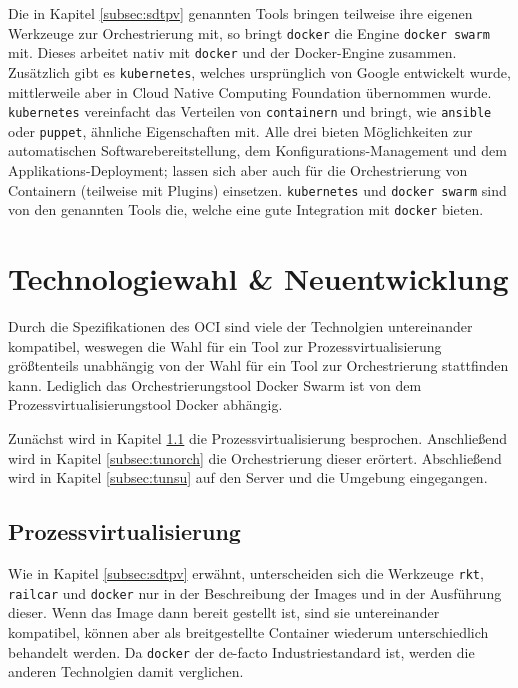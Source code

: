 \documentclass[11pt,a4paper]{article}
\begin{document}
Die in Kapitel \ref{subsec:sdtpv} genannten Tools bringen teilweise ihre 
eigenen Werkzeuge zur Orchestrierung mit, so bringt \texttt{docker} die 
Engine \texttt{docker swarm}\cite{dockSwarm} mit. Dieses arbeitet nativ mit 
\texttt{docker} und der Docker-Engine zusammen. Zusätzlich gibt es 
\texttt{kubernetes}\cite{kubernetes}, welches ursprünglich von Google 
entwickelt wurde, mittlerweile aber in Cloud Native Computing Foundation 
übernommen wurde. \texttt{kubernetes} vereinfacht das Verteilen von 
\texttt{containern} und bringt, wie \texttt{ansible}\cite{ansible} 
oder \texttt{puppet}\cite{puppet}, ähnliche Eigenschaften mit. Alle drei bieten 
Möglichkeiten zur automatischen Softwarebereitstellung, dem 
Konfigurations-Management und dem Applikations-Deployment; lassen sich aber 
auch für die Orchestrierung von Containern (teilweise mit Plugins) einsetzen. 
\texttt{kubernetes} und \texttt{docker swarm} sind von den genannten Tools die, 
welche eine gute Integration mit \texttt{docker} bieten.
\clearpage
\section{Technologiewahl \& Neuentwicklung} \label{sec:tun}
Durch die Spezifikationen des \ac{OCI} sind viele der Technolgien untereinander 
kompatibel, weswegen die Wahl für ein Tool zur Prozessvirtualisierung 
größtenteils unabhängig von der Wahl für ein Tool zur Orchestrierung 
stattfinden kann. Lediglich das Orchestrierungstool Docker Swarm ist von dem 
Prozessvirtualisierungstool Docker abhängig.

Zunächst wird in Kapitel \ref{subsec:tunpv} die Prozessvirtualisierung 
besprochen. Anschließend wird in Kapitel \ref{subsec:tunorch} die 
Orchestrierung dieser erörtert. Abschließend wird in Kapitel \ref{subsec:tunsu} 
auf den Server und die Umgebung eingegangen.
\subsection{Prozessvirtualisierung} \label{subsec:tunpv}
Wie in Kapitel \ref{subsec:sdtpv} erwähnt, unterscheiden sich die Werkzeuge 
\texttt{rkt}, \texttt{railcar} und \texttt{docker} nur in der 
Beschreibung der Images und in der Ausführung dieser. Wenn das Image dann 
bereit gestellt ist, sind sie untereinander kompatibel, können aber als 
breitgestellte Container wiederum unterschiedlich behandelt werden. Da 
\texttt{docker} der de-facto Industriestandard ist, werden die anderen 
Technolgien damit verglichen.
\end{document}
